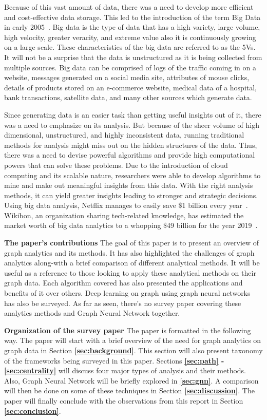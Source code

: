 \documentclass[journal,twoside,web]{ieeecolor}
\begin{document}
Because of this vast amount of data, there was a need to develop more efficient and cost-effective data storage. This led to the introduction of the term Big Data in early 2005~\cite{4}. Big data is the type of data that has a high variety, large volume, high velocity, greater veracity, and extreme value also it is continuously growing on a large scale. These characteristics of the big data are referred to as the 5Vs. It will not be a surprise that the data is unstructured as it is being collected from multiple sources. Big data can be comprised of logs of the traffic coming in on a website, messages generated on a social media site, attributes of mouse clicks, details of products stored on an e-commerce website, medical data of a hospital, bank transactions, satellite data, and many other sources which generate data.

Since generating data is an easier task than getting useful insights out of it, there was a need to emphasize on its analysis. But because of the sheer volume of high dimensional, unstructured, and highly inconsistent data, running traditional methods for analysis might miss out on the hidden structures of the data. Thus, there was a need to devise powerful algorithms and provide high computational powers that can solve these problems. Due to the introduction of cloud computing and its scalable nature, researchers were able to develop algorithms to mine and make out meaningful insights from this data. With the right analysis methods, it can yield greater insights leading to stronger and strategic decisions. Using big data analysis, Netflix manages to easily save \$1 billion every year~\cite{5}. Wikibon, an organization sharing tech-related knowledge, has estimated the market worth of big data analytics to a whopping \$49 billion for the year 2019~\cite{6}.

\textbf{The paper's contributions} The goal of this paper is to present an overview of graph analytics and its methods. It has also highlighted the challenges of graph analytics along-with a brief comparison of different analytical methods. It will be useful as a reference to those looking to apply these analytical methods on their graph data. Each algorithm covered has also presented the applications and benefits of it over others. Deep learning on graph using graph neural networks has also be surveyed. As far as seen, there's no survey paper covering these analytics methods and Graph Neural Network together.

\textbf{Organization of the survey paper} The paper is formatted in the following way. The paper will start with a brief overview of the need for graph analytics on graph data in Section \textbf{\ref{sec:background}}. This section will also present taxonomy of the frameworks being surveyed in this paper. Sections \textbf{\ref{sec:path} - \ref{sec:centrality}} will discuss four major types of analysis and their methods. Also, Graph Neural Network will be briefly explored in \textbf{\ref{sec:gnn}}. A comparison will then be done on some of these techniques in Section \textbf{\ref{sec:discussion}}. The paper will finally conclude with the observations from this report in Section \textbf{\ref{sec:conclusion}}.
\end{document}
